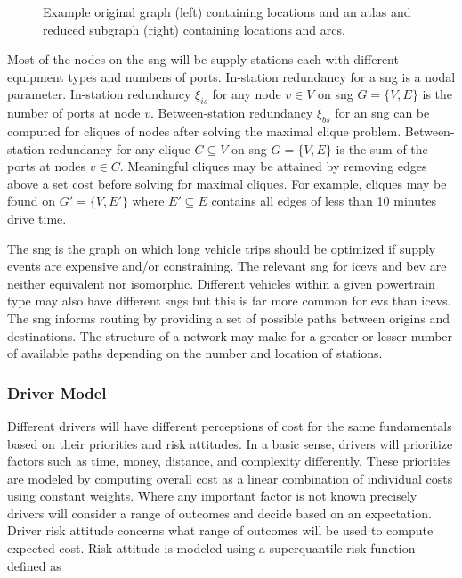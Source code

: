 \begin{figure}[H]
\begin{subfigure}[t]{.5\linewidth}
	\end{subfigure}
	\caption{Example original graph (left) containing locations and an atlas and reduced subgraph (right) containing locations and arcs.}
	\label{fig:reduced_subgraph}
\end{figure}

Most of the nodes on the \gls{sng} will be supply stations each with different equipment types and numbers of ports. In-station redundancy for a \gls{sng} is a nodal parameter. In-station redundancy $\xi_{is}$ for any node $v \in V$ on \gls{sng} $G = \{V, E\}$ is the number of ports at node $v$. Between-station redundancy $\xi_{bs}$ for an \gls{sng} can be computed for cliques of nodes after solving the maximal clique problem. Between-station redundancy for any clique $C \subseteq V$ on \gls{sng} $G = \{V, E\}$ is the sum of the ports at nodes $v \in C$. Meaningful cliques may be attained by removing edges above a set cost before solving for maximal cliques. For example, cliques may be found on $G' = \{V, E'\}$ where $E' \subseteq E$ contains all edges of less than 10 minutes drive time.

The \gls{sng} is the graph on which long vehicle trips should be optimized if supply events are expensive and/or constraining. The relevant \gls{sng} for \glspl{icev} and \gls{bev} are neither equivalent nor isomorphic. Different vehicles within a given powertrain type may also have different \glspl{sng} but this is far more common for \glspl{ev} than \glspl{icev}. The \gls{sng} informs routing by providing a set of possible paths between origins and destinations. The structure of a network may make for a greater or lesser number of available paths depending on the number and location of stations.

\subsubsection*{Driver Model}

Different drivers will have different perceptions of cost for the same fundamentals based on their priorities and risk attitudes. In a basic sense, drivers will prioritize factors such as time, money, distance, and complexity differently. These priorities are modeled by computing overall cost as a linear combination of individual costs using constant weights. Where any important factor is not known precisely drivers will consider a range of outcomes and decide based on an expectation. Driver risk attitude concerns what range of outcomes will be used to compute expected cost. Risk attitude is modeled using a superquantile risk function defined as

